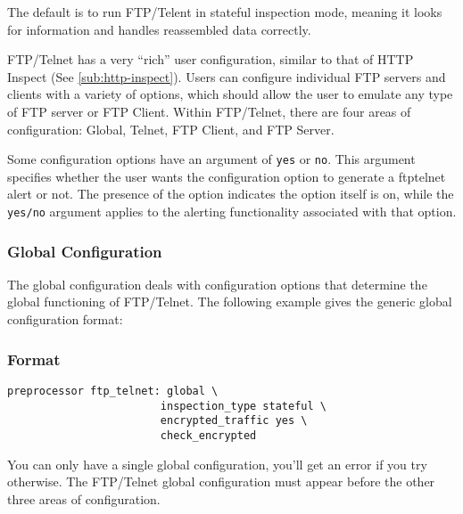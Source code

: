 \documentclass[english]{report}
\newenvironment{note}{
\samepage
    \vspace{10pt}{\textsf{
        {\hspace{7pt}\Huge{$\triangle$\hspace{-12.5pt}{\Large{$^!$}}}}\hspace{5pt}
        {\Large{NOTE}}
    }
    }
   \begin{center}
    \par\vspace{-17pt}

    \begin{lrbox}{\savepar}
    \begin{minipage}[r]{6in}
}
{
    \end{minipage}
    \end{lrbox}
    \fbox{
        \usebox{
            \savepar
	}
    }
    \par\vskip10pt
    \end{center}
}
\begin{document}
The default is to run FTP/Telent in stateful inspection mode, meaning
it looks for information and handles reassembled data correctly.

FTP/Telnet has a very ``rich'' user configuration, similar to that of
HTTP Inspect (See \ref{sub:http-inspect}).  Users can configure
individual FTP servers and clients with a variety of options, which
should allow the user to emulate any type of FTP server or FTP Client.
Within FTP/Telnet, there are four areas of configuration: Global,
Telnet, FTP Client, and FTP Server.

\begin{note}
Some configuration options have an argument of \texttt{yes} or \texttt{no}.
This argument specifies whether the user wants the configuration option to
generate a ftptelnet alert or not.  The presence of the option indicates
the option itself is on, while the \texttt{yes/no} argument applies to the
alerting functionality associated with that option.
\end{note}

\subsubsection{Global Configuration}

The global configuration deals with configuration options that determine the
global functioning of FTP/Telnet.  The following example gives the generic
global configuration format:

\subsubsection{Format}
\begin{verbatim}
preprocessor ftp_telnet: global \
                        inspection_type stateful \
                        encrypted_traffic yes \
                        check_encrypted
\end{verbatim}

You can only have a single global configuration, you'll get an error if
you try otherwise.  The FTP/Telnet global configuration must appear
before the other three areas of configuration.
\end{document}
